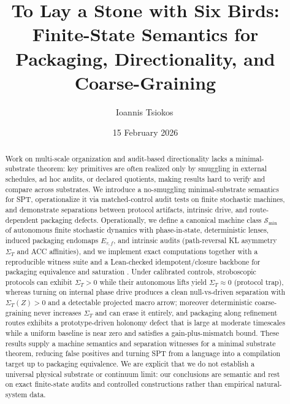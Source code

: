 \documentclass[11pt]{article}
\title{To Lay a Stone with Six Birds: Finite-State Semantics for Packaging, Directionality, and Coarse-Graining}
\author{Ioannis Tsiokos\,\orcidlink{0009-0009-7659-5964}}
\date{15 February 2026}
\theoremstyle{definition}
\theoremstyle{remark}
\newcommand{\printaffiliation}{\begin{center}\small \end{center}}
\begin{document}
\maketitle
\thispagestyle{firstpage}
\printaffiliation

\begin{abstract}
Work on multi-scale organization and audit-based directionality lacks a minimal-substrate theorem: key primitives are often realized only by smuggling in external schedules, ad hoc audits, or declared quotients, making results hard to verify and compare across substrates.
We introduce a no-smuggling minimal-substrate semantics for SPT, operationalize it via matched-control audit tests on finite stochastic machines, and demonstrate separations between protocol artifacts, intrinsic drive, and route-dependent packaging defects.
Operationally, we define a canonical machine class $\mathcal S_{\min}$ of autonomous finite stochastic dynamics with phase-in-state, deterministic lenses, induced packaging endomaps $E_{\tau,f}$, and intrinsic audits (path-reversal KL asymmetry $\Sigma_T$ and ACC affinities), and we implement exact computations together with a reproducible witness suite and a Lean-checked idempotent/closure backbone for packaging equivalence and saturation \citep{demoura2021lean4,mathlib2020}.
Under calibrated controls, stroboscopic protocols can exhibit $\Sigma_T>0$ while their autonomous lifts yield $\Sigma_T\approx 0$ (protocol trap), whereas turning on internal phase drive produces a clean null-vs-driven separation with $\Sigma_T(Z)>0$ and a detectable projected macro arrow; moreover deterministic coarse-graining never increases $\Sigma_T$ and can erase it entirely, and packaging along refinement routes exhibits a prototype-driven holonomy defect that is large at moderate timescales while a uniform baseline is near zero and satisfies a gain-plus-mismatch bound.
These results supply a machine semantics and separation witnesses for a minimal substrate theorem, reducing false positives and turning SPT from a language into a compilation target up to packaging equivalence.
We are explicit that we do not establish a universal physical substrate or continuum limit: our conclusions are semantic and rest on exact finite-state audits and controlled constructions rather than empirical natural-system data.
\end{abstract}
\end{document}
